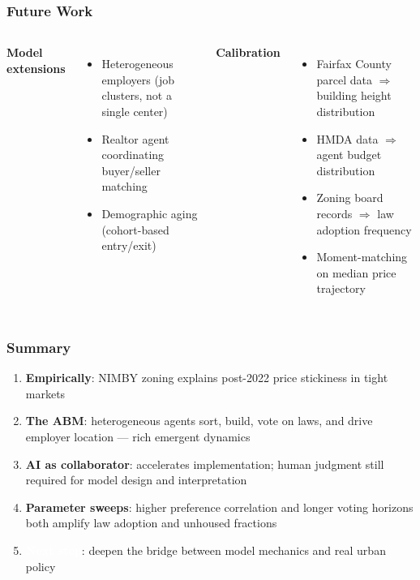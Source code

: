 \documentclass{beamer}
\begin{document}
\begin{frame}
  \frametitle{Future Work}
  \begin{columns}
    \textbf{Model extensions}
    \begin{itemize}
      \small
      \item Heterogeneous employers (job clusters, not a single center)
      \item Realtor agent coordinating buyer/seller matching
      \item Demographic aging (cohort-based entry/exit)
    \end{itemize}
    \textbf{Calibration}
    \begin{itemize}
      \small
      \item Fairfax County parcel data $\Rightarrow$ building height distribution
      \item HMDA data $\Rightarrow$ agent budget distribution
      \item Zoning board records $\Rightarrow$ law adoption frequency
      \item Moment-matching on median price trajectory
    \end{itemize}
  \end{columns}
\end{frame}


\begin{frame}
  \frametitle{Summary}
  \begin{enumerate}
    \item \textcolor{nimbyblue}{\textbf{Empirically}}: NIMBY zoning explains post-2022 price stickiness in tight markets
    \item \textcolor{nimbygreen}{\textbf{The ABM}}: heterogeneous agents sort, build, vote on laws, and drive employer location — rich emergent dynamics
    \item \textcolor{nimbyyellow}{\textbf{AI as collaborator}}: accelerates implementation; human judgment still required for model design and interpretation
    \item \textcolor{nimbyred}{\textbf{Parameter sweeps}}: higher preference correlation and longer voting horizons both amplify law adoption and unhoused fractions
    \item \textcolor{white}{\textbf{Next step}}: deepen the bridge between model mechanics and real urban policy
  \end{enumerate}
\end{frame}
\end{document}
